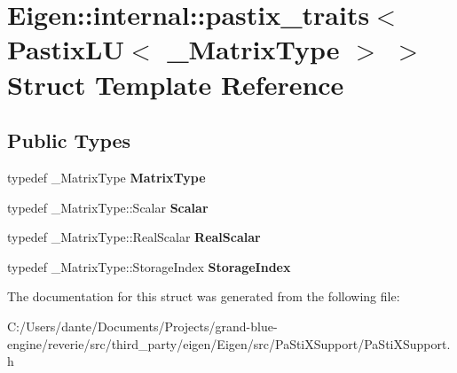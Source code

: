 \hypertarget{struct_eigen_1_1internal_1_1pastix__traits_3_01_pastix_l_u_3_01___matrix_type_01_4_01_4}{}\section{Eigen\+::internal\+::pastix\+\_\+traits$<$ Pastix\+LU$<$ \+\_\+\+Matrix\+Type $>$ $>$ Struct Template Reference}
\label{struct_eigen_1_1internal_1_1pastix__traits_3_01_pastix_l_u_3_01___matrix_type_01_4_01_4}
\subsection*{Public Types}
\begin{DoxyCompactItemize}
\item 
\mbox{\label{struct_eigen_1_1internal_1_1pastix__traits_3_01_pastix_l_u_3_01___matrix_type_01_4_01_4_ad5cf594f74d7538987a75f5db284ee4a}} 
typedef \+\_\+\+Matrix\+Type {\bfseries Matrix\+Type}
\item 
\mbox{\label{struct_eigen_1_1internal_1_1pastix__traits_3_01_pastix_l_u_3_01___matrix_type_01_4_01_4_a9a3a36d1582355961fc61b56accce68b}} 
typedef \+\_\+\+Matrix\+Type\+::\+Scalar {\bfseries Scalar}
\item 
\mbox{\label{struct_eigen_1_1internal_1_1pastix__traits_3_01_pastix_l_u_3_01___matrix_type_01_4_01_4_ab730372ff0f43dc2af281a4513832735}} 
typedef \+\_\+\+Matrix\+Type\+::\+Real\+Scalar {\bfseries Real\+Scalar}
\item 
\mbox{\label{struct_eigen_1_1internal_1_1pastix__traits_3_01_pastix_l_u_3_01___matrix_type_01_4_01_4_a18b75c7eedd17fd2ceb4011394ef650b}} 
typedef \+\_\+\+Matrix\+Type\+::\+Storage\+Index {\bfseries Storage\+Index}
\end{DoxyCompactItemize}


The documentation for this struct was generated from the following file\+:\begin{DoxyCompactItemize}
\item 
C\+:/\+Users/dante/\+Documents/\+Projects/grand-\/blue-\/engine/reverie/src/third\+\_\+party/eigen/\+Eigen/src/\+Pa\+Sti\+X\+Support/Pa\+Sti\+X\+Support.\+h\end{DoxyCompactItemize}
